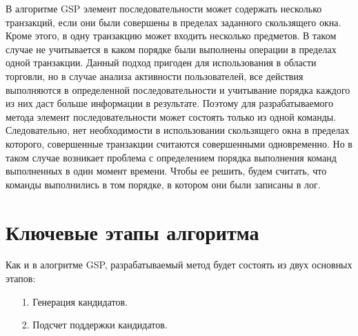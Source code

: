 В алгоритме GSP элемент последовательности может содержать несколько транзакций, если они были совершены в пределах заданного скользящего окна. Кроме этого, в одну транзакцию может входить несколько предметов. В таком случае не учитывается в каком порядке были
выполнены операции в пределах одной транзакции.
Данный подход пригоден для использования в области торговли, но в случае анализа активности пользователей,
все действия выполняются в определенной последовательности и
учитывание порядка каждого из них даст больше информации в результате.
Поэтому для разрабатываемого метода элемент последовательности может состоять только из одной команды.
Следовательно, нет необходимости в использовании скользящего окна в пределах которого, совершенные транзакции считаются совершенными одновременно. Но в таком случае возникает проблема с определением порядка выполнения команд выполненных в один момент времени. Чтобы ее решить, будем считать, что команды выполнились в том порядке, в котором они были записаны в лог.


\section{Ключевые этапы алгоритма}
Как и в алогритме GSP, разрабатываемый метод будет состоять из двух основных этапов:

\begin{enumerate}
	\item[1.] Генерация кандидатов.
	\item[2.] Подсчет поддержки кандидатов.
\end{enumerate}



